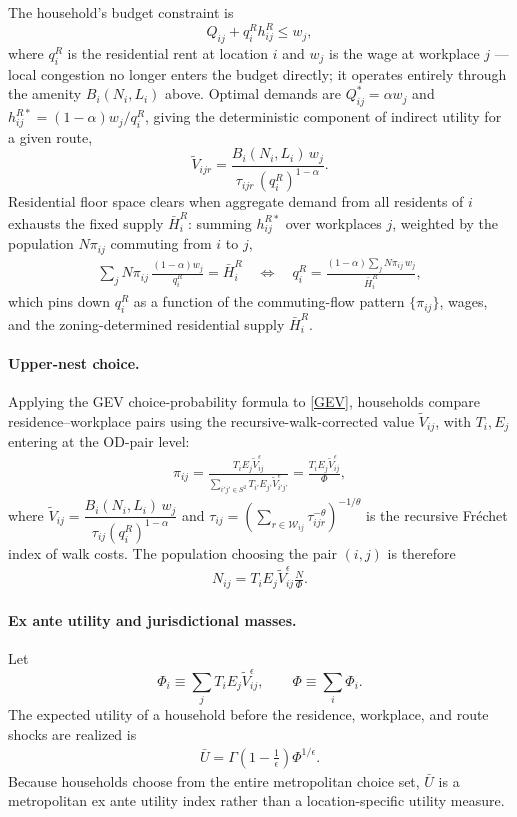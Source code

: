 \documentclass[12pt, a4paper]{article}
\theoremstyle{definition}
\theoremstyle{remark}
\begin{document}
The household's budget constraint is
\[
Q_{ij} + q_i^R h_{ij}^R \leq w_j,
\]
where $q_i^R$ is the residential rent at location $i$ and $w_j$ is the wage at workplace $j$ — local congestion no longer enters the budget directly; it operates entirely through the amenity $B_i(N_i,L_i)$ above. Optimal demands are $Q_{ij}^* = \alpha w_j$ and $h_{ij}^{R*} = (1-\alpha)w_j/q_i^R$, giving the deterministic component of indirect utility for a given route,
\[
\tilde{V}_{ijr} = \frac{B_i(N_i,L_i)\, w_j}{\tau_{ijr}\,(q_i^R)^{1-\alpha}}.
\]
Residential floor space clears when aggregate demand from all residents of $i$ exhausts the fixed supply $\bar H_i^R$: summing $h_{ij}^{R*}$ over workplaces $j$, weighted by the population $N\pi_{ij}$ commuting from $i$ to $j$,
\begin{align}
    \label{eq:rent-clearing}
    \sum_j N\pi_{ij}\,\frac{(1-\alpha)w_j}{q_i^R} = \bar H_i^R
    \quad\Longleftrightarrow\quad
    q_i^R = \frac{(1-\alpha)\sum_j N\pi_{ij}\,w_j}{\bar H_i^R},
\end{align}
which pins down $q_i^R$ as a function of the commuting-flow pattern $\{\pi_{ij}\}$, wages, and the zoning-determined residential supply $\bar H_i^R$.

\paragraph{Upper-nest choice.}
Applying the GEV choice-probability formula to \eqref{GEV}, households compare residence--workplace pairs using the recursive-walk-corrected value $\tilde V_{ij}$, with $T_i,E_j$ entering at the OD-pair level:
\begin{align}
    \label{eq:pi}
    \pi_{ij} = \frac{T_i E_j \tilde{V}_{ij}^{\epsilon}}{\sum_{i'j' \in S^{2}} T_{i'} E_{j'} \tilde{V}_{i'j'}^{\epsilon}} = \frac{T_iE_j\tilde V_{ij}^\epsilon}{\Phi},
\end{align}
where $\tilde{V}_{ij}=\dfrac{B_i(N_i,L_i)\,w_j}{\tau_{ij}(q_{i}^R)^{1-\alpha}}$ and $\tau_{ij} = \left(\sum_{r\in\mathcal W_{ij}}\tau_{ijr}^{-\theta}\right)^{-1/\theta}$ is the recursive Fréchet index of walk costs. The population choosing the pair $(i,j)$ is therefore
\begin{align}
    \label{eq:pi-pop}
    N_{ij} = T_iE_j\tilde V_{ij}^\epsilon \frac{N}{\Phi}.
\end{align}


\paragraph{Ex ante utility and jurisdictional masses.}
Let
\[
\Phi_i \equiv \sum_j T_iE_j\tilde V_{ij}^{\epsilon},
\qquad
\Phi \equiv \sum_i\Phi_i.
\]
The expected utility of a household before the residence, workplace, and route shocks are realized is
\begin{align}
    \label{eq:Ubar}
    \bar U
    =
    \Gamma\!\left(1-\tfrac{1}{\epsilon}\right)\Phi^{1/\epsilon}.
\end{align}
Because households choose from the entire metropolitan choice set, $\bar U$ is a metropolitan ex ante utility index rather than a location-specific utility measure.
\end{document}
